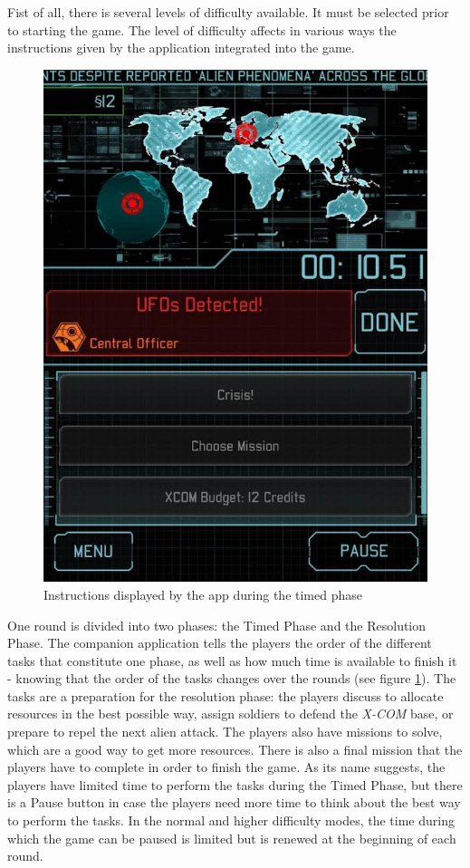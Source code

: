 Fist of all, there is several levels of difficulty available. It must be selected prior to starting the game. The level of difficulty affects in various ways the instructions given by the application integrated into the game.

\begin{figure}[!ht]
    \centering
    \includegraphics[scale=0.3]{Images/xcom_boardgame_app.jpg}
    \caption{Instructions displayed by the app during the timed phase\cite{pic:xcomapp}}
    \label{fig:XCOMAPP}
\end{figure}


One round is divided into two phases: the Timed Phase and the Resolution Phase. The companion application tells the players the order of the different tasks that constitute one phase, as well as how much time is available to finish it - knowing that the order of the tasks changes over the rounds (see figure \ref{fig:XCOMAPP}). The tasks are a preparation for the resolution phase: the players discuss to allocate resources in the best possible way, assign soldiers to defend the \textit{X-COM} base, or prepare to repel the next alien attack. 
The players also have missions to solve, which are a good way to get more resources. There is also a final mission that the players have to complete in order to finish the game. As its name suggests, the players have limited time to perform the tasks during the Timed Phase, but there is a Pause button in case the players need more time to think about the best way to perform the tasks. In the normal and higher difficulty modes, the time during which the game can be paused is limited but is renewed at the beginning of each round.

